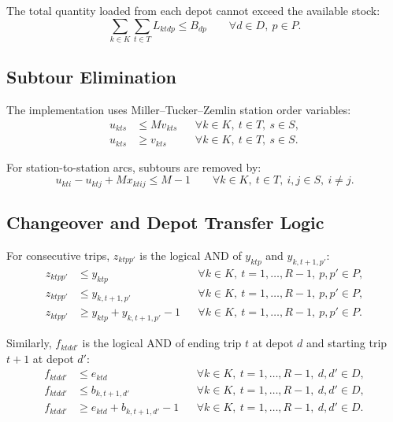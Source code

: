 \documentclass[11pt,a4paper]{article}
\begin{document}
The total quantity loaded from each depot cannot exceed the available stock:
\begin{equation}
    \sum_{k \in K}\sum_{t \in T} L_{ktdp}
    \leq B_{dp}
    \qquad \forall d \in D,\ p \in P.
\label{eq:stock}
\end{equation}

\subsection{Subtour Elimination}

The implementation uses Miller--Tucker--Zemlin station order variables:
\begin{align}
    u_{kts} &\leq M v_{kts}
        && \forall k \in K,\ t \in T,\ s \in S, \label{eq:order-upper}\\
    u_{kts} &\geq v_{kts}
        && \forall k \in K,\ t \in T,\ s \in S. \label{eq:order-lower}
\end{align}

For station-to-station arcs, subtours are removed by:
\begin{equation}
    u_{kti} - u_{ktj} + M x_{ktij} \leq M - 1
    \qquad
    \forall k \in K,\ t \in T,\ i,j \in S,\ i\neq j.
\label{eq:mtz}
\end{equation}

\subsection{Changeover and Depot Transfer Logic}

For consecutive trips, \(z_{ktpp'}\) is the logical AND of \(y_{ktp}\) and
\(y_{k,t+1,p'}\):
\begin{align}
    z_{ktpp'} &\leq y_{ktp}
        && \forall k \in K,\ t=1,\ldots,R-1,\ p,p' \in P, \label{eq:change-prev}\\
    z_{ktpp'} &\leq y_{k,t+1,p'}
        && \forall k \in K,\ t=1,\ldots,R-1,\ p,p' \in P, \label{eq:change-next}\\
    z_{ktpp'} &\geq y_{ktp}+y_{k,t+1,p'}-1
        && \forall k \in K,\ t=1,\ldots,R-1,\ p,p' \in P. \label{eq:change-and}
\end{align}

Similarly, \(f_{ktdd'}\) is the logical AND of ending trip \(t\) at depot \(d\)
and starting trip \(t+1\) at depot \(d'\):
\begin{align}
    f_{ktdd'} &\leq e_{ktd}
        && \forall k \in K,\ t=1,\ldots,R-1,\ d,d' \in D, \label{eq:transfer-end}\\
    f_{ktdd'} &\leq b_{k,t+1,d'}
        && \forall k \in K,\ t=1,\ldots,R-1,\ d,d' \in D, \label{eq:transfer-start}\\
    f_{ktdd'} &\geq e_{ktd}+b_{k,t+1,d'}-1
        && \forall k \in K,\ t=1,\ldots,R-1,\ d,d' \in D. \label{eq:transfer-and}
\end{align}
\end{document}
